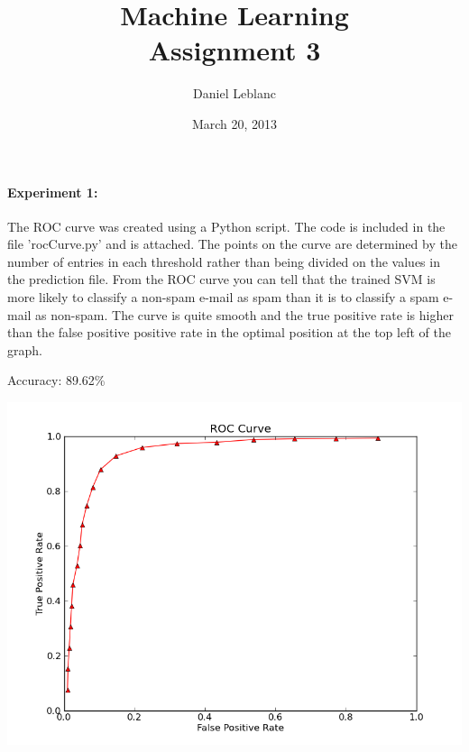 \documentclass[11pt]{article}
\title{Machine Learning\\ Assignment 3}
\author{Daniel Leblanc}
\date{March 20, 2013}
\begin{document}
\maketitle

\paragraph{Experiment 1:} The ROC curve was created using a Python script.  The code is included in the file 'rocCurve.py' and is attached.  The points on the curve are determined by the number of entries in each threshold rather than being divided on the values in the prediction file.  From the ROC curve you can tell that the trained SVM is more likely to classify a non-spam e-mail as spam than it is to classify a spam e-mail as non-spam.  The curve is quite smooth and the true positive rate is higher than the false positive positive rate in the optimal position at the top left of the graph.
\begin{center}
  Accuracy: 89.62\%
\end{center}

\begin{center}
  \includegraphics[width=6.0in]{q1curve.png}
\end{center}
\end{document}
